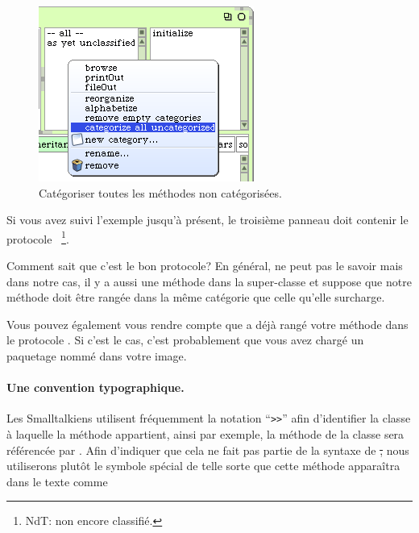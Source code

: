 \documentclass[a4paper,10pt,twoside]{book}
\begin{document}
\begin{figure}[htbp]
   \centering
   \includegraphics[scale=0.7]{Categorize} 
   \caption{Catégoriser toutes les méthodes non catégorisées.\label{fig:categorize}}
\end{figure}

Si vous avez suivi l'exemple jusqu'à présent, le troisième panneau doit contenir le protocole ~\footnote{NdT: non encore classifié.}.

Comment \sq sait que c'est le bon protocole? En général,
\sq ne peut pas le savoir mais dans notre cas, il y a aussi une méthode  dans la super-classe et \sq suppose que notre méthode  doit être rangée dans la même catégorie que celle qu'elle surcharge.

Vous pouvez également vous rendre compte que \sq a déjà rangé votre
méthode  dans le protocole . Si
c'est le cas, c'est probablement que vous avez chargé un paquetage nommé  dans votre image.

\paragraph{Une convention typographique.} Les Smalltalkiens utilisent fréquemment la notation ``\verb|>>|'' afin d'identifier la classe à laquelle la méthode appartient, ainsi par exemple, la méthode  de la classe  sera référencée par .
Afin d'indiquer que cela ne fait pas partie de la syntaxe de \st, nous utiliserons plutôt le symbole spécial \ct{>>>} de telle sorte que cette méthode apparaîtra dans le texte comme 
\end{document}
